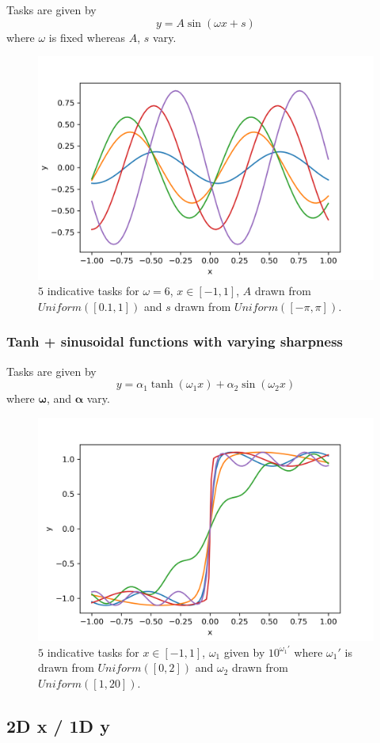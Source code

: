 Tasks are given by 
\begin{equation}
	y = A \sin(\omega x + s)
\end{equation}
where $\omega$ is fixed whereas $A$, $s$ vary.
\begin{figure}[H]
	\centering
	\includegraphics[width=.55\linewidth]{./figs/sinusoidal_functions.png}  
	\caption{$5$ indicative tasks for $\omega = 6$, $x \in [-1, 1]$, $A$ drawn from $Uniform([0.1,1])$ and $s$ drawn from $Uniform([-\pi,\pi])$.}
	\label{}
\end{figure}

\subsubsection{Tanh + sinusoidal functions with varying sharpness}

Tasks are given by 
\begin{equation}
	y = \alpha_1 \tanh(\omega_1 x) + \alpha_2 \sin(\omega_2 x)
\end{equation}
where $\bm{\omega}$, and $\bm{\alpha}$ vary.
\begin{figure}[H]
	\centering
	\includegraphics[width=.55\linewidth]{./figs/tanh_plus_sin_functions.png}  
	\caption{$5$ indicative tasks for $x \in [-1, 1]$, $\omega_1$ given by $10^{\omega_1'}$ where $\omega_1'$ is drawn from $Uniform([0,2])$ and $\omega_2$ drawn from $Uniform([1,20])$.}
	\label{}
\end{figure}

\subsection{2D x / 1D y}
